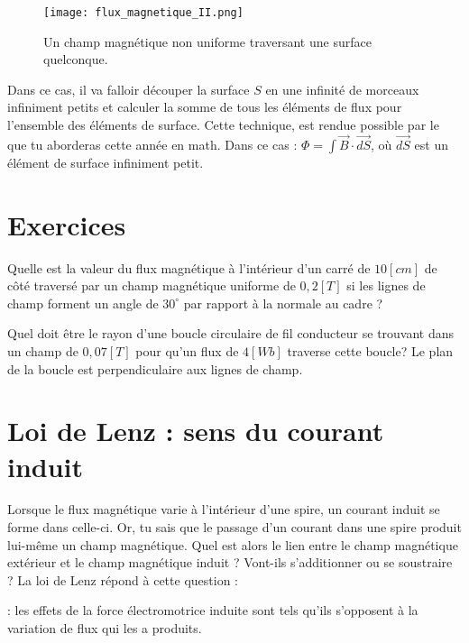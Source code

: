 \begin{figure}[h]
    \centering
    \texttt{[image: flux\_magnetique\_II.png]}
    \caption{Un champ magnétique non uniforme traversant une surface quelconque.}
    \label{flux_magnetique_II}
\end{figure}

Dans ce cas, il va falloir découper la surface \(S\) en une infinité de morceaux infiniment petits et calculer la somme de tous les éléments de flux pour l'ensemble des éléments de surface. Cette technique, est rendue possible par le  que tu aborderas cette année en math. Dans ce cas :
\(\Phi =  \int \vec{B} \cdot \vec{dS}\), où \(\vec{dS}\) est un élément de surface infiniment petit.

\newpage

\section{Exercices}
\begin{exercise}
    Quelle est la valeur du flux magnétique à l'intérieur d'un carré de \(10[cm]\) de côté traversé par un champ magnétique uniforme de \(0,2[T]\) si les lignes de champ forment un angle de \(30^{\circ}\) par rapport à la normale au cadre ?
\end{exercise}

\begin{exercise}
    Quel doit être le rayon d'une boucle circulaire de fil conducteur se trouvant dans un champ de \(0,07[T]\) pour qu'un flux de \(4[Wb]\) traverse cette boucle? Le plan de la boucle est perpendiculaire aux lignes de champ.
\end{exercise}

\newpage

\section{Loi de Lenz : sens du courant induit}
Lorsque le flux magnétique varie à l'intérieur d'une spire, un courant induit se forme dans celle-ci. Or, tu sais que le passage d'un courant dans une spire produit lui-même un champ magnétique.
Quel est alors le lien entre le champ magnétique extérieur et le champ magnétique induit ? Vont-ils s'additionner ou se soustraire ?
La loi de Lenz répond à cette question :

\begin{encadre}
     : les effets de la force électromotrice\footnotemark{} induite sont tels qu'ils s'opposent à la variation de flux qui les a produits.
\end{encadre}

